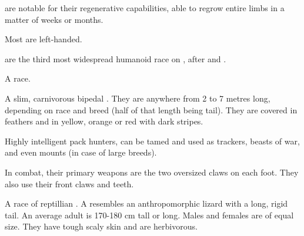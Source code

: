\begin{gloss}
\Meccara{} are notable for their regenerative capabilities, able to regrow entire limbs in a matter of weeks or months. 

Most \meccara{} are left-handed. 

\Meccara{} are the third most widespread humanoid race on \Miith{}, after  and . 








\begin{comment}
\paragraph{\nephil}
\end{comment}
\gitem[\nephilim]{\nephil}
A  race.








\begin{comment}
\paragraph{\nycan}
\end{comment}
\gitem{\nycan}
A slim, carnivorous bipedal . 
They are anywhere from 2 to 7 metres long, depending on race and breed (half of that length being tail).
They are covered in feathers and \coloured in yellow, orange or red with dark stripes. 

Highly intelligent pack hunters, \nycans{} can be tamed and used as trackers, beasts of war, and even mounts (in case of large breeds).

In combat, their primary weapons are the two oversized claws on each foot. 
They also use their front claws and teeth. 








\begin{comment}
\paragraph{\scatha}
\end{comment}
\gitem[\scathae]{\scatha}
A race of reptillian . 
A \scatha{} resembles an anthropomorphic lizard with a long, rigid tail. 
An average adult is 170-180 cm tall or long. 
Males and females are of equal size. 
They have tough scaly skin and are herbivorous. 


\end{gloss}
